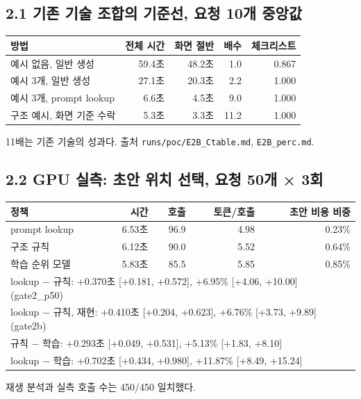 \documentclass[10pt,a4paper]{article}
\begin{document}
\subsection*{2.1 기존 기술 조합의 기준선, 요청 10개 중앙값}
\begin{table}[H]\centering\small
\begin{tabular}{lrrrr}
\toprule
방법 & 전체 시간 & 화면 절반 & 배수 & 체크리스트\\
\midrule
예시 없음, 일반 생성 & 59.4초 & 48.2초 & 1.0 & 0.867\\
예시 3개, 일반 생성 & 27.1초 & 20.3초 & 2.2 & 1.000\\
예시 3개, prompt lookup & 6.6초 & 4.5초 & 9.0 & 1.000\\
구조 예시, 화면 기준 수락 & 5.3초 & 3.3초 & 11.2 & 1.000\\
\bottomrule
\end{tabular}
\end{table}
11배는 기존 기술의 성과다. 출처 \texttt{runs/poc/E2B\_Ctable.md}, \texttt{E2B\_perc.md}.

\subsection*{2.2 GPU 실측: 초안 위치 선택, 요청 50개 × 3회}
\begin{table}[H]\centering\small
\begin{tabular}{lrrrr}
\toprule
정책 & 시간 & 호출 & 토큰/호출 & 초안 비용 비중\\
\midrule
prompt lookup & 6.53초 & 96.9 & 4.98 & 0.23\%\\
구조 규칙 & 6.12초 & 90.0 & 5.52 & 0.64\%\\
학습 순위 모델 & 5.83초 & 85.5 & 5.85 & 0.85\%\\
\midrule
\multicolumn{5}{l}{lookup − 규칙: +0.370초 [+0.181, +0.572], +6.95\% [+4.06, +10.00] (gate2\_p50)}\\
\multicolumn{5}{l}{lookup − 규칙, 재현: +0.410초 [+0.204, +0.623], +6.76\% [+3.73, +9.89] (gate2b)}\\
\multicolumn{5}{l}{규칙 − 학습: +0.293초 [+0.049, +0.531], +5.13\% [+1.83, +8.10]}\\
\multicolumn{5}{l}{lookup − 학습: +0.702초 [+0.434, +0.980], +11.87\% [+8.49, +15.24]}\\
\bottomrule
\end{tabular}
\end{table}
재생 분석과 실측 호출 수는 450/450 일치했다.
\end{document}

